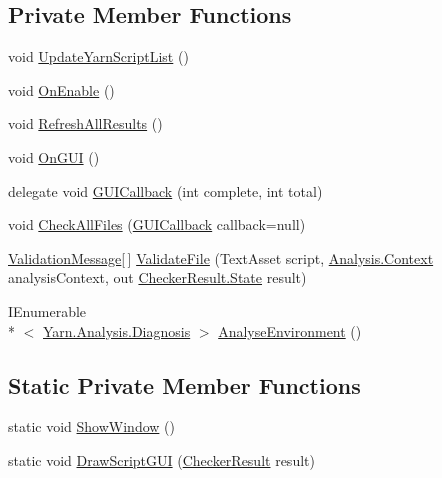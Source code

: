 \subsection*{Private Member Functions}
\begin{DoxyCompactItemize}
\item 
void \hyperlink{a00166_a406febf62d77eaabc235f6316e537345}{Update\-Yarn\-Script\-List} ()
\item 
void \hyperlink{a00166_aeba1f39189758bd91bdce298e8859947}{On\-Enable} ()
\item 
void \hyperlink{a00166_ae4faac1a6b0cc9710b20267dc4b88995}{Refresh\-All\-Results} ()
\item 
void \hyperlink{a00166_aec84840262ae8fd7d84605778de1dc39}{On\-G\-U\-I} ()
\item 
delegate void \hyperlink{a00166_a8f57c8688d68ae4a5ce708e665902bc0}{G\-U\-I\-Callback} (int complete, int total)
\item 
void \hyperlink{a00166_a8e59ec20bd21bb1f8a6d4f02980f624b}{Check\-All\-Files} (\hyperlink{a00166_a8f57c8688d68ae4a5ce708e665902bc0}{G\-U\-I\-Callback} callback=null)
\item 
\hyperlink{a00166_a00358}{Validation\-Message}\mbox{[}$\,$\mbox{]} \hyperlink{a00166_a6f2bf42b228ea29c6477e369226db8b6}{Validate\-File} (Text\-Asset script, \hyperlink{a00056}{Analysis.\-Context} analysis\-Context, out \hyperlink{a00049_ab24848d7951ce44eb3c7768c6ee10385}{Checker\-Result.\-State} result)
\item 
I\-Enumerable\\*
$<$ \hyperlink{a00089}{Yarn.\-Analysis.\-Diagnosis} $>$ \hyperlink{a00166_a9c207786c349120dc439bdce53072191}{Analyse\-Environment} ()
\end{DoxyCompactItemize}
\subsection*{Static Private Member Functions}
\begin{DoxyCompactItemize}
\item 
static void \hyperlink{a00166_a2084e2ce6ccf18094a992985aa5330fb}{Show\-Window} ()
\item 
static void \hyperlink{a00166_a1a7e1a855bb2a9549eb1c0eb292c9b85}{Draw\-Script\-G\-U\-I} (\hyperlink{a00049}{Checker\-Result} result)
\end{DoxyCompactItemize}
